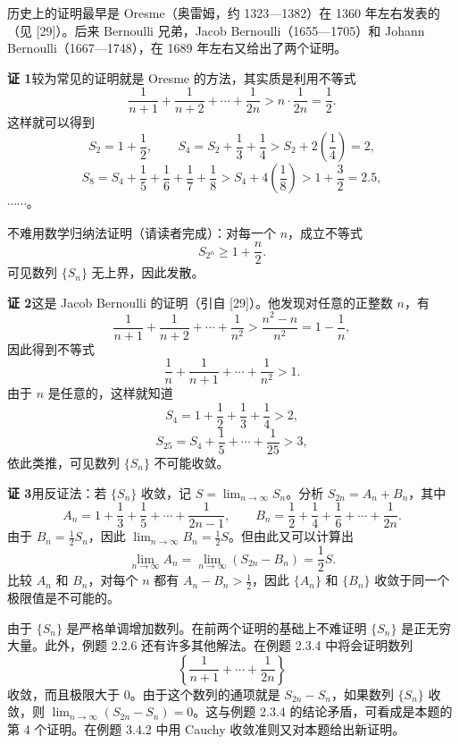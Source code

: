 历史上的证明最早是 Oresme（奥雷姆，约 1323—1382）在 1360 年左右发表的（见 [29]）。后来 Bernoulli 兄弟，Jacob Bernoulli（1655—1705）和 Johann Bernoulli（1667—1748），在 1689 年左右又给出了两个证明。

\begin{xproof}
\textbf{证 1}\quad 较为常见的证明就是 Oresme 的方法，其实质是利用不等式
\begin{equation}
  \frac1{n+1}+\frac1{n+2}+\cdots+\frac1{2n}>n\cdot\frac1{2n}=\frac12.
  \tag{2.3}
  \label{eq:2.3}
\end{equation}
这样就可以得到
\[
  S_2=1+\frac12,
  \qquad
  S_4=S_2+\frac13+\frac14>S_2+2\left(\frac14\right)=2,
\]
\[
  S_8=S_4+\frac15+\frac16+\frac17+\frac18
  >S_4+4\left(\frac18\right)>1+\frac32=2.5,
\]
$\cdots\cdots$。

不难用数学归纳法证明（请读者完成）：对每一个 $n$，成立不等式
\[
  S_{2^n}\ge1+\frac n2.
\]
可见数列 $\{S_n\}$ 无上界，因此发散。

\textbf{证 2}\quad 这是 Jacob Bernoulli 的证明（引自 [29]）。他发现对任意的正整数 $n$，有
\[
  \frac1{n+1}+\frac1{n+2}+\cdots+\frac1{n^2}>\frac{n^2-n}{n^2}=1-\frac1n,
\]
因此得到不等式
\begin{equation}
  \frac1n+\frac1{n+1}+\cdots+\frac1{n^2}>1.
  \tag{2.4}
  \label{eq:2.4}
\end{equation}
由于 $n$ 是任意的，这样就知道
\[
  S_4=1+\frac12+\frac13+\frac14>2,
\]
\[
  S_{25}=S_4+\frac15+\cdots+\frac1{25}>3,
\]
依此类推，可见数列 $\{S_n\}$ 不可能收敛。

\textbf{证 3}\quad 用反证法：若 $\{S_n\}$ 收敛，记 $S=\displaystyle\lim_{n\to\infty}S_n$。分析 $S_{2n}=A_n+B_n$，其中
\[
  A_n=1+\frac13+\frac15+\cdots+\frac1{2n-1},
  \qquad
  B_n=\frac12+\frac14+\frac16+\cdots+\frac1{2n}.
\]
由于 $B_n=\frac12S_n$，因此 $\displaystyle\lim_{n\to\infty}B_n=\frac12S$。但由此又可以计算出
\[
  \lim_{n\to\infty}A_n
  =\lim_{n\to\infty}(S_{2n}-B_n)=\frac12S.
\]
比较 $A_n$ 和 $B_n$，对每个 $n$ 都有 $A_n-B_n>\frac12$，因此 $\{A_n\}$ 和 $\{B_n\}$ 收敛于同一个极限值是不可能的。
\end{xproof}

\begin{xremark}
由于 $\{S_n\}$ 是严格单调增加数列。在前两个证明的基础上不难证明 $\{S_n\}$ 是正无穷大量。此外，例题 2.2.6 还有许多其他解法。在例题 2.3.4 中将会证明数列
\[
  \left\{\frac1{n+1}+\cdots+\frac1{2n}\right\}
\]
收敛，而且极限大于 0。由于这个数列的通项就是 $S_{2n}-S_n$，如果数列 $\{S_n\}$ 收敛，则 $\displaystyle\lim_{n\to\infty}(S_{2n}-S_n)=0$。这与例题 2.3.4 的结论矛盾，可看成是本题的第 4 个证明。在例题 3.4.2 中用 Cauchy 收敛准则又对本题给出新证明。
\end{xremark}

